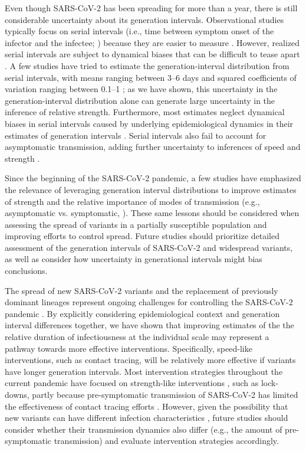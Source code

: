\documentclass[12pt]{article}
\begin{document}
Even though SARS-CoV-2 has been spreading for more than a year, there is still considerable uncertainty about its generation intervals.
Observational studies typically focus on serial intervals (i.e., time between symptom onset of the infector and the infectee; \cite{svensson2007note}) because they are easier to measure \citep{griffin2020rapid}.
However, realized serial intervals are subject to dynamical biases that can be difficult to tease apart \citep{park2021forward}.
A few studies have tried to estimate the generation-interval distribution from serial intervals, with means ranging between 3--6 days and squared coefficients of variation ranging between 0.1--1 \citep{ferretti2020quantifying,Ferretti2020timing,ganyani2020estimating,knight2020estimating}; 
as we have shown, this uncertainty in the generation-interval distribution alone can generate large uncertainty in the inference of relative strength.
Furthermore, most estimates neglect dynamical biases in serial intervals caused by underlying epidemiological dynamics in their estimates of generation intervals \citep{park2021forward}.
Serial intervals also fail to account for asymptomatic transmission, adding further uncertainty to inferences of speed and strength \citep{park2020time}.

Since the beginning of the SARS-CoV-2 pandemic, a few studies have emphasized the relevance of leveraging generation interval distributions to improve estimates of strength \citep{doi:10.1098/rsif.2020.0144,ali2020serial,gostic2020practical,park2021forward} and the relative importance of modes of transmission (e.g., asymptomatic vs. symptomatic, \cite{park2020time}).
These same lessons should be considered when assessing the spread of variants in a partially susceptible population and improving efforts to control spread.
Future studies should prioritize detailed assessment of the generation intervals of SARS-CoV-2 and widespread variants, as well as consider how uncertainty in generational intervals might bias conclusions.

The spread of new SARS-CoV-2 variants and the replacement of previously dominant lineages represent ongoing challenges for controlling the SARS-CoV-2 pandemic \citep{abdool2021new,fontanet2021sars,walensky2021sars}.  
By explicitly considering epidemiological context and generation interval differences together, we have shown that improving estimates of the the relative duration of infectiousness at the individual scale may represent a pathway towards more effective interventions. 
Specifically, speed-like interventions, such as contact tracing, will be relatively more effective if variants have longer generation intervals.
Most intervention strategies throughout the current pandemic have focused on strength-like interventions \citep{flaxman2020Rt}, such as lock-downs, partly because pre-symptomatic transmission of SARS-CoV-2 has limited the effectiveness of contact tracing efforts \citep{hellewell2020feasibility}.
However, given the possibility that new variants can have different infection characteristics \citep{kissler2021densely}, future studies should consider whether their transmission dynamics also differ (e.g., the amount of pre-symptomatic transmission) and evaluate intervention strategies accordingly.
\end{document}
